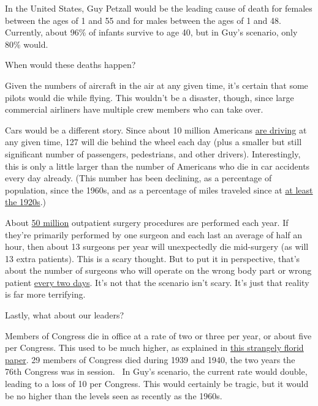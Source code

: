 {In the United States, Guy Petzall would be the leading cause of death for females between the ages of 1 and 55 and for males between the ages of 1 and 48. Currently, about 96\% of infants survive to age 40, but in Guy’s scenario, only 80\% would.}

{When would these deaths happen?}

{Given the numbers of aircraft in the air at any given time, it’s certain that some pilots would die while flying. This wouldn’t be a disaster, though, since large commercial airliners have multiple crew members who can take over.}

{Cars would be a different story. Since about 10 million Americans \href{http://what-if.xkcd.com/5/}{are driving} at any given time, 127 will die behind the wheel each day (plus a smaller but still significant number of passengers, pedestrians, and other drivers). Interestingly, this is only a little larger than the number of Americans who die in car accidents every day already. (This number has been declining, as a percentage of population, since the 1960s, and as a percentage of miles traveled since at \href{http://www.saferoads.org/federal/2004/TrafficFatalities1899-2003.pdf} {at least the 1920s}.)}

{About \href{http://www.cdc.gov/nchs/data/nhsr/nhsr011.pdf}{50 million} outpatient surgery procedures are performed each year. If they’re primarily performed by one surgeon and each last an average of half an hour, then about 13 surgeons per year will unexpectedly die mid-surgery (as will 13 extra patients). This is a scary thought. But to put it in perspective, that’s about the number of surgeons who will operate on the wrong body part or wrong patient \emph{} \href{http://www.cnn.com/2011/HEALTH/04/28/ep.wrong.side.surgery/index.html} {every two days}. It’s not that the scenario isn’t scary. It’s just that reality is far more terrifying.}

{Lastly, what about our leaders?}

{Members of Congress die in office at a rate of two or three per year, or about five per Congress. This used to be much higher, as explained in \href{http://home.gwu.edu/\~forrest/fmdeathincongressps.pdf}{this strangely florid paper}. 29 members of Congress died during 1939 and 1940, the two years the 76th Congress was in session.  In Guy’s scenario, the current rate would double, leading to a loss of 10 per Congress. This would certainly be tragic, but it would be no higher than the levels seen as recently as the 1960s.}

